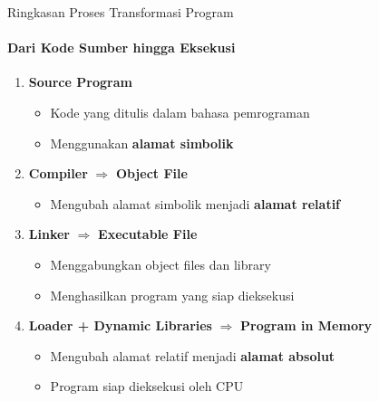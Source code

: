 \documentclass[10pt,aspectratio=169]{beamer}
\begin{document}
\begin{frame}{Ringkasan Proses Transformasi Program}
    \framesubtitle{Dari Kode Sumber hingga Eksekusi}
    
    \begin{enumerate}
        \item \textbf{Source Program}
        \begin{itemize}
            \item Kode yang ditulis dalam bahasa pemrograman
            \item Menggunakan \textbf{alamat simbolik}
        \end{itemize}
        
        \item \textbf{Compiler} $\Rightarrow$ \textbf{Object File}
        \begin{itemize}
            \item Mengubah alamat simbolik menjadi \textbf{alamat relatif}
        \end{itemize}
        
        \item \textbf{Linker} $\Rightarrow$ \textbf{Executable File}
        \begin{itemize}
            \item Menggabungkan object files dan library
            \item Menghasilkan program yang siap dieksekusi
        \end{itemize}
        
        \item \textbf{Loader + Dynamic Libraries} $\Rightarrow$ \textbf{Program in Memory}
        \begin{itemize}
            \item Mengubah alamat relatif menjadi \textbf{alamat absolut}
            \item Program siap dieksekusi oleh CPU
        \end{itemize}
    \end{enumerate}
\end{frame}
\end{document}
